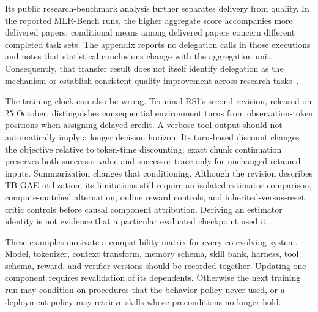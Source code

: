 Its public research-benchmark analysis further separates delivery from quality. In the reported MLR-Bench runs, the higher aggregate score accompanies more delivered papers; conditional means among delivered papers concern different completed task sets. The appendix reports no delegation calls in those executions and notes that statistical conclusions change with the aggregation unit. Consequently, that transfer result does not itself identify delegation as the mechanism or establish consistent quality improvement across research tasks~\cite{root_mass2026}.

The training clock can also be wrong. Terminal-RSI's second revision, released on 25 October, distinguishes consequential environment turns from observation-token positions when assigning delayed credit. A verbose tool output should not automatically imply a longer decision horizon. Its turn-based discount changes the objective relative to token-time discounting; exact chunk continuation preserves both successor value and successor trace only for unchanged retained inputs. Summarization changes that conditioning. Although the revision describes TB-GAE utilization, its limitations still require an isolated estimator comparison, compute-matched alternation, online reward controls, and inherited-versus-reset critic controls before causal component attribution. Deriving an estimator identity is not evidence that a particular evaluated checkpoint used it~\cite{cumulative_c_terminalrsi_v2}.

These examples motivate a compatibility matrix for every co-evolving system. Model, tokenizer, context transform, memory schema, skill bank, harness, tool schema, reward, and verifier versions should be recorded together. Updating one component requires revalidation of its dependents. Otherwise the next training run may condition on procedures that the behavior policy never used, or a deployment policy may retrieve skills whose preconditions no longer hold.

